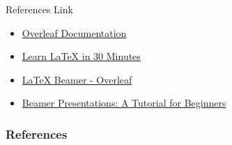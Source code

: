 \documentclass{beamer}
\begin{document}
\begin{frame}{References Link}
    \begin{itemize}
        \item \href{https://www.overleaf.com/learn}{Overleaf Documentation}
        \item \href{https://www.overleaf.com/learn/latex/Learn_LaTeX_in_30_minutes}{Learn LaTeX in 30 Minutes}
        \item \href{https://www.overleaf.com/learn/latex/Beamer}{LaTeX Beamer - Overleaf}
        \item \href{https://www.overleaf.com/learn/latex/Beamer_Presentations:_A_Tutorial_for_Beginners_(Part_1)\%E2\%80\%94Getting_Started}{Beamer Presentations: A Tutorial for Beginners}
    \end{itemize}
\end{frame}


\begin{frame}[t, allowframebreaks]
\frametitle{References}
\footnotesize


\end{frame}
\end{document}
